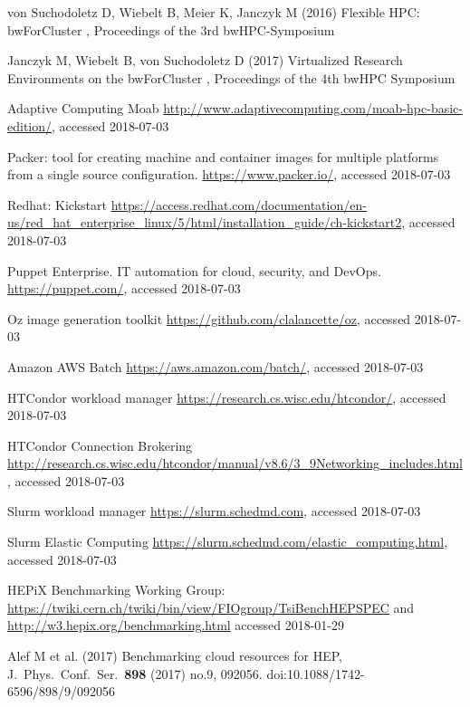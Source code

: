 \begin{thebibliography}{}
 von Suchodoletz D,  Wiebelt B,  Meier K,  Janczyk M (2016)
  Flexible HPC: bwForCluster \NEMO,
  Proceedings of the 3rd bwHPC-Symposium %

 Janczyk M,  Wiebelt B, von Suchodoletz D (2017)
  Virtualized Research Environments on the bwForCluster \NEMO,
  Proceedings of the 4th bwHPC Symposium 


Adaptive Computing Moab
\url{http://www.adaptivecomputing.com/moab-hpc-basic-edition/}, accessed 2018-07-03

Packer: tool for creating machine and container images for multiple platforms from a single source configuration. 
\url{https://www.packer.io/}, accessed 2018-07-03

 Redhat: Kickstart
\url{https://access.redhat.com/documentation/en-us/red_hat_enterprise_linux/5/html/installation_guide/ch-kickstart2}, accessed 2018-07-03

Puppet Enterprise. IT automation for cloud, security, and DevOps.
\url{https://puppet.com/}, accessed 2018-07-03


Oz image generation toolkit
\url{https://github.com/clalancette/oz}, accessed 2018-07-03

Amazon AWS Batch
\url{https://aws.amazon.com/batch/}, accessed 2018-07-03

HTCondor workload manager
\url{https://research.cs.wisc.edu/htcondor/}, accessed 2018-07-03

HTCondor Connection Brokering
\url{http://research.cs.wisc.edu/htcondor/manual/v8.6/3_9Networking_includes.html}, accessed 2018-07-03

  Slurm workload manager
  \url{https://slurm.schedmd.com}, accessed 2018-07-03
    
Slurm Elastic Computing
\url{https://slurm.schedmd.com/elastic_computing.html}, accessed 2018-07-03


 HEPiX Benchmarking Working Group:
\url{https://twiki.cern.ch/twiki/bin/view/FIOgroup/TsiBenchHEPSPEC}
and \url{http://w3.hepix.org/benchmarking.html} accessed 2018-01-29



Alef M  et al. (2017) Benchmarking cloud resources for HEP,
J.\ Phys.\ Conf.\ Ser.\  {\bf 898} (2017) no.9,  092056.
doi:10.1088/1742-6596/898/9/092056



\end{thebibliography}
